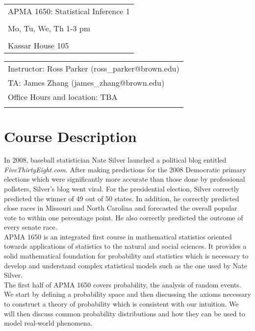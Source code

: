 \documentclass[11pt]{article}
\begin{document}
\begin{tabular}{ l }
 \LARGE APMA 1650: Statistical Inference 1 \\\\
 \LARGE Mo, Tu, We, Th 1-3 pm \\\\
 \LARGE Kassar House 105
\end{tabular}
\vspace{5mm}

\begin{tabular}{ l }
   \large Instructor: Ross Parker (ross\_parker@brown.edu) \\
   \large TA: James Zhang (james\_zhang@brown.edu) \\
   \large Office Hours and location: TBA \\
   \large  \\
\end{tabular}

\section*{Course Description}
In 2008, baseball statistician Nate Silver launched a political blog entitled \emph{FiveThirtyEight.com}. After making predictions for the 2008 Democratic primary elections which were significantly more accurate than those done by professional pollsters, Silver's blog went viral. For the presidential election, Silver correctly predicted the winner of 49 out of 50 states. In addition, he correctly predicted close races in Missouri and North Carolina and forecasted the overall popular vote to within one percentage point. He also correctly predicted the outcome of every senate race.\\

APMA 1650 is an integrated first course in mathematical statistics oriented towards applications of statistics to the natural and social sciences. It provides a solid mathematical foundation for probability and statistics which is necessary to develop and understand complex statistical models such as the one used by Nate Silver.\\

The first half of APMA 1650 covers probability, the analysis of random events. We start by defining a probability space and then discussing the axioms necessary to construct a theory of probability which is consistent with our intuition. We will then discuss common probability distributions and how they can be used to model real-world phenomena.\\
\end{document}
